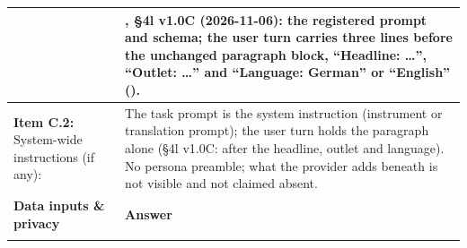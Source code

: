 \documentclass[12pt]{article}
\begin{document}
{\begin{longtable}{|J|K|}
\\[2pt]
& , \S4l v1.0C (2026-11-06): the registered prompt and schema; the user turn carries three lines before the unchanged paragraph block, ``Headline: \ldots'', ``Outlet: \ldots'' and ``Language: German'' or ``English'' ().
\\
\hline
\textbf{Item C.2:} System-wide instructions (if any):
&
The task prompt is the system instruction (instrument or translation prompt); the user turn holds the paragraph alone (\S4l v1.0C: after the headline, outlet and language). No persona preamble; what the provider adds beneath is not visible and not claimed absent.
\\
\hline
{}
\textbf{Data inputs \& privacy} & \textbf{Answer} \\*


\end{longtable}}
\end{document}
